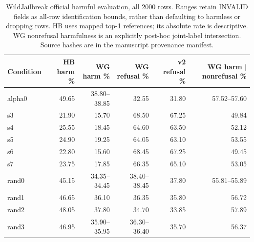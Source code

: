 \begin{table}[t]
\centering\small
\begin{tabular}{lrrrrr}
\toprule
Condition & HB harm \% & WG harm \% & WG refusal \% & v2 refusal \% & WG harm $|$ nonrefusal \% \\
\midrule
alpha0 & 49.65 & 38.80--38.85 & 32.55 & 31.80 & 57.52--57.60 \\
s3 & 21.90 & 15.70 & 68.50 & 67.25 & 49.84 \\
s4 & 25.55 & 18.45 & 64.60 & 63.50 & 52.12 \\
s5 & 24.90 & 19.25 & 64.05 & 63.10 & 53.55 \\
s6 & 22.80 & 15.60 & 68.45 & 67.25 & 49.45 \\
s7 & 23.75 & 17.85 & 66.35 & 65.10 & 53.05 \\
rand0 & 45.15 & 34.35--34.45 & 38.40--38.45 & 37.80 & 55.81--55.89 \\
rand1 & 46.65 & 36.10 & 36.35 & 35.80 & 56.72 \\
rand2 & 48.05 & 37.80 & 34.70 & 33.85 & 57.89 \\
rand3 & 46.95 & 35.90--35.95 & 36.30--36.40 & 35.70 & 56.37 \\
\bottomrule
\end{tabular}
\caption{WildJailbreak official harmful evaluation, all 2000 rows. Ranges retain INVALID fields as all-row identification bounds, rather than defaulting to harmless or dropping rows. HB uses mapped top-1 references; its absolute rate is descriptive. WG nonrefusal harmfulness is an explicitly post-hoc joint-label intersection. Source hashes are in the manuscript provenance manifest.}
\label{tab:wjb-unit-rates}
\end{table}
